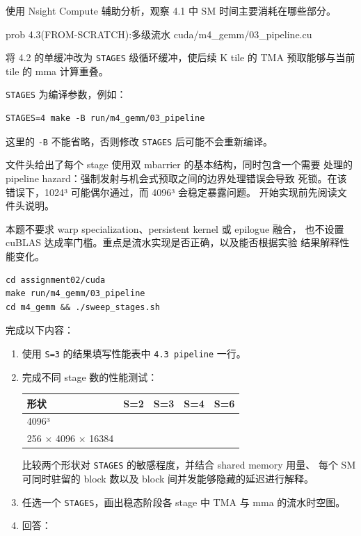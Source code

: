 \documentclass[11pt,a4paper,fontset=fandol]{ctexart}
\begin{document}
使用 Nsight Compute 辅助分析，观察 4.1 中 SM 时间主要消耗在哪些部分。

\begin{capstone}{prob 4.3(FROM-SCRATCH):多级流水 \hfill {\footnotesize\ttfamily cuda/m4\_gemm/03\_pipeline.cu}}

将 4.2 的单缓冲改为 \texttt{STAGES} 级循环缓冲，使后续 K tile 的 TMA
预取能够与当前 tile 的 mma 计算重叠。

\texttt{STAGES} 为编译参数，例如：

\begin{verbatim}
STAGES=4 make -B run/m4_gemm/03_pipeline
\end{verbatim}

这里的 \texttt{-B} 不能省略，否则修改 \texttt{STAGES}
后可能不会重新编译。

文件头给出了每个 stage 使用双 mbarrier 的基本结构，同时包含一个需要
处理的 pipeline hazard：强制发射与机会式预取之间的边界处理错误会导致
死锁。在该错误下，1024³ 可能偶尔通过，而 4096³ 会稳定暴露问题。
开始实现前先阅读文件头说明。

本题不要求 warp specialization、persistent kernel 或 epilogue 融合，
也不设置 cuBLAS 达成率门槛。重点是流水实现是否正确，以及能否根据实验
结果解释性能变化。

\begin{verbatim}
cd assignment02/cuda
make run/m4_gemm/03_pipeline
cd m4_gemm && ./sweep_stages.sh
\end{verbatim}

完成以下内容：

\begin{enumerate}
\def\labelenumi{\arabic{enumi}.}
\item
  使用 \texttt{S=3} 的结果填写性能表中 \texttt{4.3\ pipeline} 一行。
\item
  完成不同 stage 数的性能测试：

  \begin{longtable}[]{@{}lllll@{}}
  \toprule\noalign{}
  形状 & S=2 & S=3 & S=4 & S=6 \\
  \midrule\noalign{}
  \endhead
  \bottomrule\noalign{}
  \endlastfoot
  4096³ & & & & \\
  256 × 4096 × 16384 & & & & \\
  \end{longtable}

  比较两个形状对 \texttt{STAGES} 的敏感程度，并结合 shared memory 用量、
  每个 SM 可同时驻留的 block 数以及 block 间并发能够隐藏的延迟进行解释。
\item
  任选一个 \texttt{STAGES}，画出稳态阶段各 stage 中 TMA 与 mma
  的流水时空图。
\item
  回答：


\end{enumerate}
\end{capstone}
\end{document}
